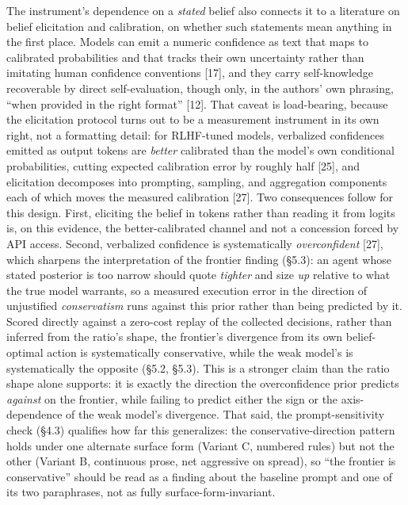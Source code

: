 \documentclass[
  11pt,
]{article}
\begin{document}
The instrument's dependence on a \emph{stated} belief also connects it to a literature on belief elicitation and calibration, on whether such statements mean anything in the first place. Models can emit a numeric confidence as text that maps to calibrated probabilities and that tracks their own uncertainty rather than imitating human confidence conventions {[}17{]}, and they carry self-knowledge recoverable by direct self-evaluation, though only, in the authors' own phrasing, ``when provided in the right format'' {[}12{]}. That caveat is load-bearing, because the elicitation protocol turns out to be a measurement instrument in its own right, not a formatting detail: for RLHF-tuned models, verbalized confidences emitted as output tokens are \emph{better} calibrated than the model's own conditional probabilities, cutting expected calibration error by roughly half {[}25{]}, and elicitation decomposes into prompting, sampling, and aggregation components each of which moves the measured calibration {[}27{]}. Two consequences follow for this design. First, eliciting the belief in tokens rather than reading it from logits is, on this evidence, the better-calibrated channel and not a concession forced by API access. Second, verbalized confidence is systematically \emph{overconfident} {[}27{]}, which sharpens the interpretation of the frontier finding (§5.3): an agent whose stated posterior is too narrow should quote \emph{tighter} and size \emph{up} relative to what the true model warrants, so a measured execution error in the direction of unjustified \emph{conservatism} runs against this prior rather than being predicted by it. Scored directly against a zero-cost replay of the collected decisions, rather than inferred from the ratio's shape, the frontier's divergence from its own belief-optimal action is systematically conservative, while the weak model's is systematically the opposite (§5.2, §5.3). This is a stronger claim than the ratio shape alone supports: it is exactly the direction the overconfidence prior predicts \emph{against} on the frontier, while failing to predict either the sign or the axis-dependence of the weak model's divergence. That said, the prompt-sensitivity check (§4.3) qualifies how far this generalizes: the conservative-direction pattern holds under one alternate surface form (Variant C, numbered rules) but not the other (Variant B, continuous prose, net aggressive on spread), so ``the frontier is conservative'' should be read as a finding about the baseline prompt and one of its two paraphrases, not as fully surface-form-invariant.
\end{document}
